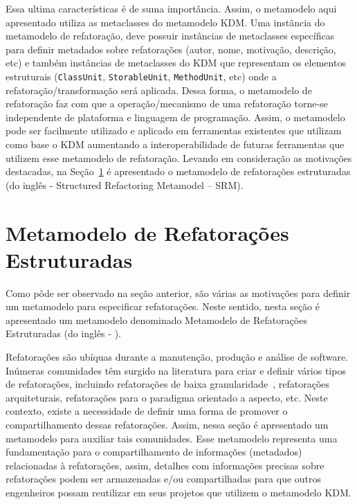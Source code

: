 Essa ultima características é de suma importância. Assim, o metamodelo aqui apresentado utiliza as metaclasses do metamodelo KDM. Uma instância do metamodelo de refatoração, deve possuir instâncias de metaclasses específicas para definir metadados sobre refatorações (autor, nome, motivação, descrição, etc) e também instâncias de metaclasses do KDM que representam os elementos estruturais (\texttt{ClassUnit}, \texttt{StorableUnit}, \texttt{MethodUnit}, etc) onde a refatoração/transformação será aplicada. Dessa forma, o metamodelo de refatoração faz com que a operação/mecanismo de uma refatoração torne-se independente de plataforma e linguagem de programação. Assim, o metamodelo pode ser facilmente utilizado e aplicado em ferramentas existentes que utilizam como base o KDM aumentando a interoperabilidade de futuras ferramentas que utilizem esse metamodelo de refatoração. Levando em consideração as motivações destacadas, na Seção~\ref{sec:meta_modelo_de_refatora_es_estruturadas_srm_do_ingl_s_structured refactoring meta-model_} é apresentado o metamodelo de refatorações estruturadas (do inglês - Structured Refactoring Metamodel – SRM).  



\section{Metamodelo de Refatorações Estruturadas} %
\label{sec:meta_modelo_de_refatora_es_estruturadas_srm_do_ingl_s_structured refactoring meta-model_}

Como pôde ser observado na seção anterior, são várias as motivações para definir um metamodelo para especificar refatorações. Neste sentido, nesta seção é apresentado um metamodelo denominado Metamodelo de Refatorações Estruturadas (do inglês - ).

Refatorações são ubíquas durante a manutenção, produção e análise de software. Inúmeras comunidades têm surgido na literatura para criar e definir vários tipos de refatorações, incluindo refatorações de baixa granularidade~\cite{Fowler1999, Demeyer1, Demeyer2}, refatorações arquiteturais, refatorações para o paradigma orientado a aspecto, etc. Neste contexto, existe a necessidade de definir uma forma de promover o compartilhamento dessas refatorações. Assim, nessa seção é apresentado um metamodelo para auxiliar tais comunidades. Esse metamodelo representa uma fundamentação para o compartilhamento de informações (metadados) relacionadas à refatorações, assim, detalhes com informações precisas sobre refatorações podem ser armazenadas e/ou compartilhadas para que outros engenheiros possam reutilizar em seus projetos que utilizem o metamodelo KDM.

